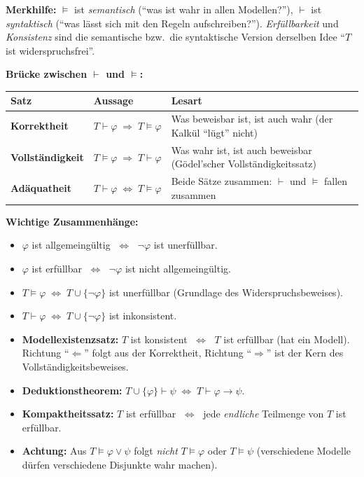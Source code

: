 \medskip
\noindent\textbf{Merkhilfe:} $\models$ ist \emph{semantisch} (\enquote{was ist wahr in allen Modellen?}), $\vdash$ ist \emph{syntaktisch} (\enquote{was lässt sich mit den Regeln aufschreiben?}). \emph{Erfüllbarkeit} und \emph{Konsistenz} sind die semantische bzw.\ die syntaktische Version derselben Idee \enquote{$T$ ist widerspruchsfrei}.

\medskip
\noindent\textbf{Brücke zwischen $\vdash$ und $\models$:}
\begin{center}
\renewcommand{\arraystretch}{1.5}
\begin{tabularx}{\textwidth}{l l X}
\textbf{Satz} & \textbf{Aussage} & \textbf{Lesart} \\
\hline
\textbf{Korrektheit} & $T\vdash\varphi \;\Rightarrow\; T\models\varphi$ & Was beweisbar ist, ist auch wahr (der Kalkül \enquote{lügt} nicht) \\
\textbf{Vollständigkeit} & $T\models\varphi \;\Rightarrow\; T\vdash\varphi$ & Was wahr ist, ist auch beweisbar (Gödel'scher Vollständigkeitssatz) \\
\textbf{Adäquatheit} & $T\vdash\varphi \;\Longleftrightarrow\; T\models\varphi$ & Beide Sätze zusammen: $\vdash$ und $\models$ fallen zusammen \\
\end{tabularx}
\end{center}

\medskip
\noindent\textbf{Wichtige Zusammenhänge:}
\begin{itemize}\itemsep2pt
  \item $\varphi$ ist allgemeingültig $\;\Longleftrightarrow\;$ $\neg\varphi$ ist unerfüllbar.
  \item $\varphi$ ist erfüllbar $\;\Longleftrightarrow\;$ $\neg\varphi$ ist nicht allgemeingültig.
  \item $T\models\varphi \;\Longleftrightarrow\; T\cup\{\neg\varphi\}$ ist unerfüllbar \quad(Grundlage des Widerspruchsbeweises).
  \item $T\vdash\varphi \;\Longleftrightarrow\; T\cup\{\neg\varphi\}$ ist inkonsistent.
  \item \textbf{Modellexistenzsatz:} $T$ ist konsistent $\;\Longleftrightarrow\;$ $T$ ist erfüllbar (hat ein Modell). \\
        Richtung \enquote{$\Leftarrow$} folgt aus der Korrektheit, Richtung \enquote{$\Rightarrow$} ist der Kern des Vollständigkeitsbeweises.
  \item \textbf{Deduktionstheorem:} $T\cup\{\varphi\}\vdash\psi \;\Longleftrightarrow\; T\vdash\varphi\to\psi$.
  \item \textbf{Kompaktheitssatz:} $T$ ist erfüllbar $\;\Longleftrightarrow\;$ jede \emph{endliche} Teilmenge von $T$ ist erfüllbar.
  \item \textbf{Achtung:} Aus $T\models\varphi\vee\psi$ folgt \emph{nicht} $T\models\varphi$ oder $T\models\psi$ (verschiedene Modelle dürfen verschiedene Disjunkte wahr machen).
\end{itemize}


